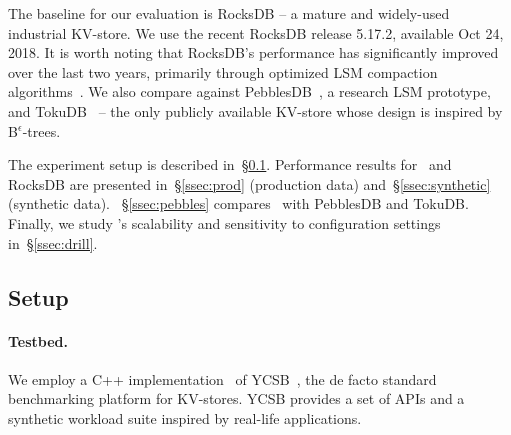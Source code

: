 The baseline for our evaluation is RocksDB -- a mature and widely-used industrial KV-store. 
We use the recent RocksDB release 5.17.2, available Oct 24, 2018.  It is worth noting that RocksDB's performance 
has significantly improved  over the last two years, primarily through optimized LSM compaction algorithms~\cite{CallaghanCompaction}.   
We also compare against PebblesDB~\cite{PebblesDB}, a research LSM prototype, and TokuDB~\cite{TokuDB} -- the only publicly 
available KV-store whose design is inspired by B$^\epsilon$-trees.

The experiment setup is described in~\S\ref{ssec:setup}. 
Performance results for \sys\ and RocksDB are presented in~\S\ref{ssec:prod} (production data)
and~\S\ref{ssec:synthetic} (synthetic data). ~\S\ref{ssec:pebbles} compares \sys\ with PebblesDB and TokuDB. 
Finally, we study  \sys's scalability and sensitivity to configuration settings in~\S\ref{ssec:drill}. 
 
\subsection{Setup}
\label{ssec:setup} 

\paragraph{Testbed.} We employ a C++ implementation~\cite{Cpp-YCSB} of YCSB~\cite{YCSB}, the  de facto standard  
benchmarking platform for KV-stores. YCSB provides a set of APIs and a synthetic workload suite inspired 
by real-life applications. 
 
